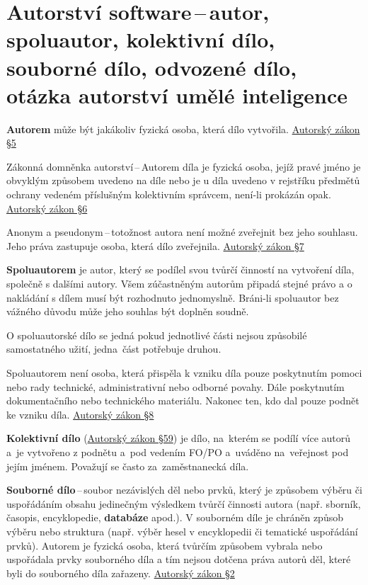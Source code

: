 \newpage
\section{Autorství software\,--\,autor, spoluautor, kolektivní dílo, souborné dílo, odvozené dílo, otázka autorství umělé inteligence}
\textbf{Autorem} může být jakákoliv fyzická osoba, která dílo vytvořila. \href{https://www.zakonyprolidi.cz/cs/2000-121#p5}{Autorský zákon §5}

Zákonná domněnka autorství\,--\,Autorem díla je fyzická osoba, jejíž pravé jméno je obvyklým způsobem uvedeno na díle nebo je u díla uvedeno v rejstříku předmětů ochrany vedeném příslušným kolektivním správcem, není-li prokázán opak. \href{https://www.zakonyprolidi.cz/cs/2000-121#p6}{Autorský zákon §6}

Anonym a pseudonym\,--\,totožnost autora není možné zveřejnit bez jeho souhlasu. Jeho práva zastupuje osoba, která dílo zveřejnila. \href{https://www.zakonyprolidi.cz/cs/2000-121#p7}{Autorský zákon §7}

\textbf{Spoluautorem} je autor, který se podílel svou tvůrčí činností na vytvoření díla, společně s dalšími autory. Všem zúčastněným autorům připadá stejné právo a o nakládání s dílem musí být rozhodnuto jednomyslně. Bráni-li spoluautor bez vážného důvodu může jeho souhlas být doplněn soudně.

O spoluautorské dílo se jedná pokud jednotlivé části nejsou způsobilé samostatného užití, jedna~část potřebuje druhou.

Spoluautorem není osoba, která přispěla k vzniku díla pouze poskytnutím pomoci nebo rady technické, administrativní nebo odborné povahy. Dále poskytnutím dokumentačního nebo technického materiálu. Nakonec ten, kdo dal pouze podnět ke vzniku díla. \href{https://www.zakonyprolidi.cz/cs/2000-121#p8}{Autorský zákon §8}

\textbf{Kolektivní dílo} (\href{https://www.zakonyprolidi.cz/cs/2000-121#p59}{Autorský zákon §59}) je dílo, na~kterém se podílí více autorů a~je vytvořeno z podnětu a~pod vedením FO/PO a~uváděno na~veřejnost pod jejím jménem. Považují se často za~zaměstnanecká díla.

\textbf{Souborné dílo}\,--\,soubor nezávislých děl nebo prvků, který je způsobem výběru či uspořádáním obsahu jedinečným výsledkem tvůrčí činnosti autora (např. sborník, časopis, encyklopedie, \textbf{databáze} apod.). V souborném díle je chráněn způsob výběru nebo struktura (např. výběr hesel v encyklopedii či tematické uspořádání prvků). Autorem je fyzická osoba, která tvůrčím způsobem vybrala nebo uspořádala prvky souborného díla a tím nejsou dotčena práva autorů děl, které byli do souborného díla zařazeny. \href{https://www.zakonyprolidi.cz/cs/2000-121#p2}{Autorský zákon §2}

